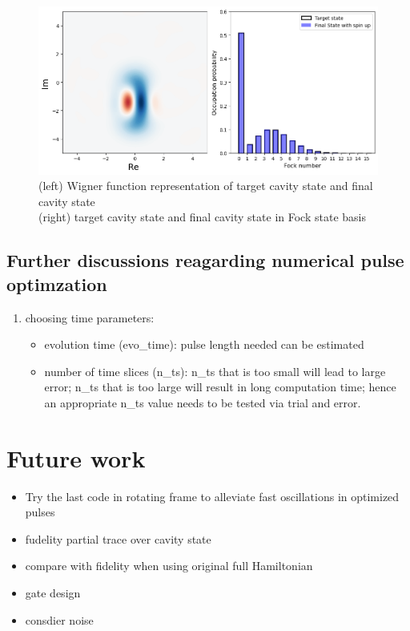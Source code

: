 \documentclass[12pt]{article}
\begin{document}
\begin{figure}[H]
    \centering
    \includegraphics[width=0.95\linewidth]{vac2cat_simulation.png}
    \caption{
       (left) Wigner function representation of target cavity state and final cavity state 
       \\
       (right) target cavity state and final cavity state in Fock state basis
    }
    \label{fig:vac2cat_simulation}
\end{figure}



\subsection{Further discussions reagarding numerical pulse optimzation}
\begin{enumerate}
    \item choosing time parameters: 
        \begin{itemize}
            \item evolution time (evo\_time): pulse length needed can be estimated %
            \item number of time slices (n\_ts): n\_ts that is too small will lead to large error; 
                n\_ts that is too large will result in long computation time; 
                hence an appropriate n\_ts value needs to be tested via trial and error.
        \end{itemize}
\end{enumerate}

\section{Future work}\label{sec:future_work}
\begin{itemize}
    \item Try the last code in rotating frame to alleviate fast oscillations in optimized pulses
    \item fudelity partial trace over cavity state
    \item compare with fidelity when using original full Hamiltonian 
    \item gate design 
    \item consdier noise
\end{itemize}
\end{document}
